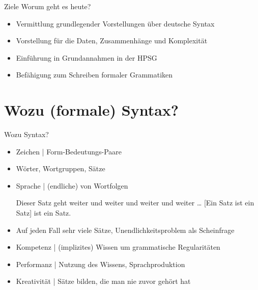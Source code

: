 
\begin{frame}
  {Ziele}
  \onslide<+->
  \onslide<+->
  Worum geht es heute?\\
  \Zeile
  \begin{itemize}
    \item Vermittlung grundlegender Vorstellungen über deutsche Syntax
    \item Vorstellung für die Daten, Zusammenhänge und Komplexität
    \item Einführung in Grundannahmen in der HPSG
    \item Befähigung zum Schreiben formaler Grammatiken
  \end{itemize}
  \Zeile
  \centering 
\end{frame}



\section{Wozu (formale) Syntax?}

\begin{frame}
  {Wozu Syntax?}
  \onslide<+->
  \begin{itemize}[<+->]
    \item \alert{Zeichen} | Form-Bedeutungs-Paare \citep{Saussure16a-Fr}
    \item Wörter, Wortgruppen, Sätze
    \item Sprache |  (endliche)  von Wortfolgen\\
      \begin{exe}
        \ex Dieser Satz geht weiter und weiter und weiter und weiter \ldots
        \ex {}[Ein Satz ist ein Satz] ist ein Satz.
      \end{exe}
      \Halbzeile
    \item Auf jeden Fall \alert{sehr viele Sätze}, Unendlichkeitsproblem als Scheinfrage
    \item \alert{Kompetenz} | (implizites) Wissen um grammatische Regularitäten
    \item \alert{Performanz} | Nutzung des Wissens, Sprachproduktion
      \Halbzeile
    \item \alert{Kreativität} | Sätze bilden, die man nie zuvor gehört hat
  \end{itemize}
\end{frame}
 
